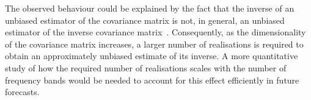 \documentclass[../../thesis.tex]{subfiles}
\begin{document}
The observed behaviour could be explained by the fact that the inverse of an unbiased estimator of the covariance matrix is not, in general, an unbiased estimator of the inverse covariance matrix~\cite{taylor2013}. Consequently, as the dimensionality of the covariance matrix increases, a larger number of realisations is required to obtain an approximately unbiased estimate of its inverse. A more quantitative study of how the required number of realisations scales with the number of frequency bands would be needed to account for this effect efficiently in future forecasts.
\end{document}
